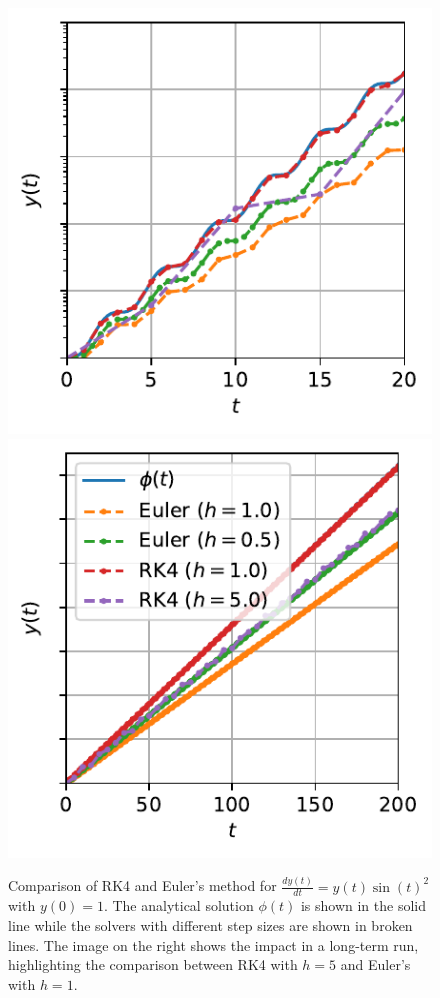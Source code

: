 \begin{figure}[h]
    \centering
    \includegraphics{images/ode_solver_comparison_zoom.pdf}
    \includegraphics{images/ode_solver_comparison.pdf}
    \caption[Comparison of \gls{RK4} and Euler's method for $\frac{d y\left( t \right) }{dt} = y(t)\sin(t)^2$ with $y(0)=1$.]{Comparison of \gls{RK4} and Euler's method for $\frac{d y\left( t \right) }{dt} = y(t)\sin(t)^2$ with $y(0)=1$. The analytical solution $\phi(t)$ is shown in the solid line while the solvers with different step sizes are shown in broken lines. The image on the right shows the impact in a long-term run, highlighting the comparison between \gls{RK4} with $h=5$ and Euler's with $h=1$.}
    \label{fig:ode_comparison}
\end{figure}

